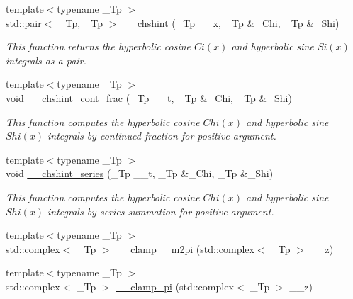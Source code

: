 \begin{DoxyCompactItemize}
{\footnotesize template$<$typename \+\_\+\+Tp $>$ }\\std\+::pair$<$ \+\_\+\+Tp, \+\_\+\+Tp $>$ \hyperlink{namespacestd_1_1____detail_aa07abc4dac6cf589ccd12d3ce40277cf}{\+\_\+\+\_\+chshint} (\+\_\+\+Tp \+\_\+\+\_\+x, \+\_\+\+Tp \&\+\_\+\+Chi, \+\_\+\+Tp \&\+\_\+\+Shi)
\begin{DoxyCompactList}\small\item\em This function returns the hyperbolic cosine $ Ci(x) $ and hyperbolic sine $ Si(x) $ integrals as a pair. \end{DoxyCompactList}\item 
{\footnotesize template$<$typename \+\_\+\+Tp $>$ }\\void \hyperlink{namespacestd_1_1____detail_a07da2303d36d77bfad393a7b8ebdf686}{\+\_\+\+\_\+chshint\+\_\+cont\+\_\+frac} (\+\_\+\+Tp \+\_\+\+\_\+t, \+\_\+\+Tp \&\+\_\+\+Chi, \+\_\+\+Tp \&\+\_\+\+Shi)
\begin{DoxyCompactList}\small\item\em This function computes the hyperbolic cosine $ Chi(x) $ and hyperbolic sine $ Shi(x) $ integrals by continued fraction for positive argument. \end{DoxyCompactList}\item 
{\footnotesize template$<$typename \+\_\+\+Tp $>$ }\\void \hyperlink{namespacestd_1_1____detail_a16055b6e4baa35ffe5c6d9495d9d0158}{\+\_\+\+\_\+chshint\+\_\+series} (\+\_\+\+Tp \+\_\+\+\_\+t, \+\_\+\+Tp \&\+\_\+\+Chi, \+\_\+\+Tp \&\+\_\+\+Shi)
\begin{DoxyCompactList}\small\item\em This function computes the hyperbolic cosine $ Chi(x) $ and hyperbolic sine $ Shi(x) $ integrals by series summation for positive argument. \end{DoxyCompactList}\item 
{\footnotesize template$<$typename \+\_\+\+Tp $>$ }\\std\+::complex$<$ \+\_\+\+Tp $>$ \hyperlink{namespacestd_1_1____detail_a4b52c9c0f24edd3c61c771f55f20002b}{\+\_\+\+\_\+clamp\+\_\+\_\+m2pi} (std\+::complex$<$ \+\_\+\+Tp $>$ \+\_\+\+\_\+z)
\item 
{\footnotesize template$<$typename \+\_\+\+Tp $>$ }\\std\+::complex$<$ \+\_\+\+Tp $>$ \hyperlink{namespacestd_1_1____detail_aa341299d514aa754403a775b9ed51c91}{\+\_\+\+\_\+clamp\+\_\+pi} (std\+::complex$<$ \+\_\+\+Tp $>$ \+\_\+\+\_\+z)
\item 

\end{DoxyCompactItemize}

